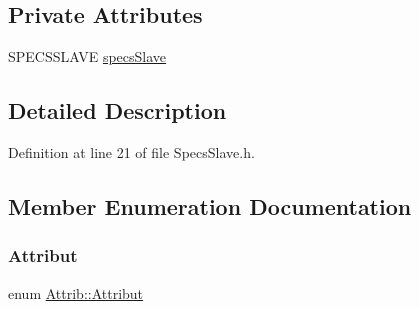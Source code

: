 \subsection*{Private Attributes}
\begin{DoxyCompactItemize}
\item 
S\+P\+E\+C\+S\+S\+L\+A\+VE \hyperlink{classSpecsSlave_a98f0190d671023c3d874088ea2bd874b}{specs\+Slave}
\end{DoxyCompactItemize}


\subsection{Detailed Description}


Definition at line 21 of file Specs\+Slave.\+h.



\subsection{Member Enumeration Documentation}
\mbox{\label{classAttrib_a69e171d7cc6417835a5a306d3c764235}} 
\subsubsection{\texorpdfstring{Attribut}{Attribut}}
{\footnotesize\ttfamily enum \hyperlink{classAttrib_a69e171d7cc6417835a5a306d3c764235}{Attrib\+::\+Attribut}\hspace{0.3cm}{\ttfamily [inherited]}}

